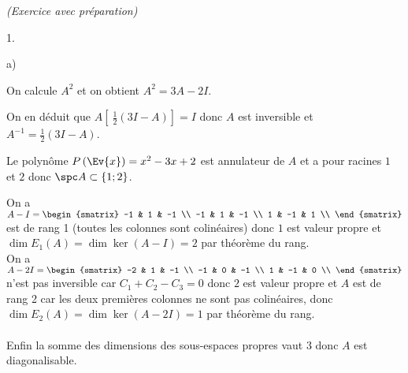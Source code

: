 \documentclass[11pt]{article}%
\begin{document}
\begin{exercice}{\it (Exercice avec préparation)}
 \begin{noliste}{1.}
 \setlength{\itemsep}{4mm}
 \item \begin{noliste}{a)}
 \setlength{\itemsep}{2mm}
 \item On calcule $A^{2}$ et on obtient $A^{2} = 3 A - 2I$. \\
 \item On en déduit que $A \left[ \ \frac{1}{2} ( 3I - A) \right] = I$
donc $A$ est inversible et $A^{-1} = \frac{1}{2} ( 3I - A)$. \\
 \end{noliste}
 \item Le polynôme $P\left(\Ev{x}\right) = x^{2} - 3 x + 2$ est
annulateur de $A$ et a pour racines $1$ et $2$ donc $\spc A \subset \{
1 ; 2\}$.
 \item On a $A - I = \begin{smatrix}
-1 & 1 & -1 \\
-1 & 1 & -1 \\
1 & -1 & 1 \\
\end{smatrix}
$ est de rang 1 (toutes les colonnes sont colinéaires) donc $1$ est
valeur propre et $\dim E_{1} (A) = \dim \ker (A-I) = 2$ par théorème du
rang. \\
 On a $A - 2I = \begin{smatrix}
-2 & 1 & -1 \\
-1 & 0 & -1 \\
1 & -1 & 0 \\
\end{smatrix}
$ n'est pas inversible car $C_{1} + C_{2} - C_{3} = 0$ donc $2$ est
valeur propre et $A$ est de rang 2 car les deux premières colonnes ne
sont pas colinéaires, donc $\dim E_{2} (A) = \dim \ker (A-2I) = 1$ par
théorème du rang. \\
\\
 Enfin la somme des dimensions des sous-espaces propres vaut 3 donc $A$
est diagonalisable.
 \end{noliste}
 \end{exercice}

 \newpage
\end{document}
